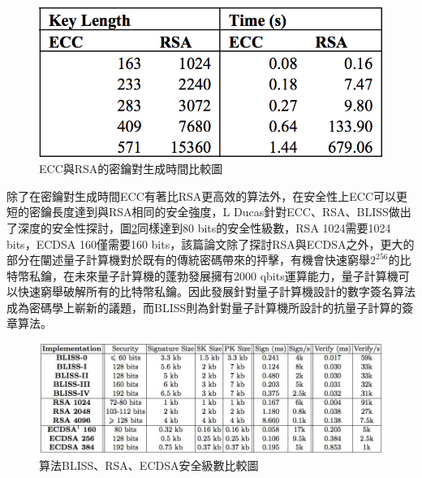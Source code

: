 				\begin{figure}[htbp]
					\centering
					\includegraphics[width = .5\textwidth]{ECCtime.png}
					\caption{ECC與RSA的密鑰對生成時間比較圖\supercite{Performancecomparisonofellipticcurveandrsadigitalsignatures}}\label{ECCtime}
				\end{figure}

				除了在密鑰對生成時間ECC有著比RSA更高效的算法外，在安全性上ECC可以更短的密鑰長度達到與RSA相同的安全強度，L Ducas針對ECC、RSA、BLISS\supercite{LatticesignaturesandbimodalGaussians}做出了深度的安全性探討\supercite{LatticesignaturesandbimodalGaussians}，圖\ref{LatticesignaturesandbimodalGaussians}同樣達到80 bits的安全性級數，RSA 1024需要1024 bits，ECDSA 160\supercite{DeploymentsofEllipticCurveCryptography}僅需要160 bits，該篇論文除了探討RSA與ECDSA之外，更大的部分在闡述量子計算機對於既有的傳統密碼帶來的抨擊，有機會快速窮舉$2^{256}$的比特幣私鑰，在未來量子計算機的蓬勃發展擁有2000 qbits運算能力，量子計算機可以快速窮舉破解所有的比特幣私鑰。因此發展針對量子計算機設計的數字簽名算法成為密碼學上嶄新的議題，而BLISS則為針對量子計算機所設計的抗量子計算的簽章算法。

				\begin{figure}[htbp]
					\centering
					\includegraphics[width = 1\textwidth]{LatticesignaturesandbimodalGaussians.png}
					\caption{算法BLISS、RSA、ECDSA安全級數比較圖\supercite{LatticesignaturesandbimodalGaussians}}\label{LatticesignaturesandbimodalGaussians}
				\end{figure}

